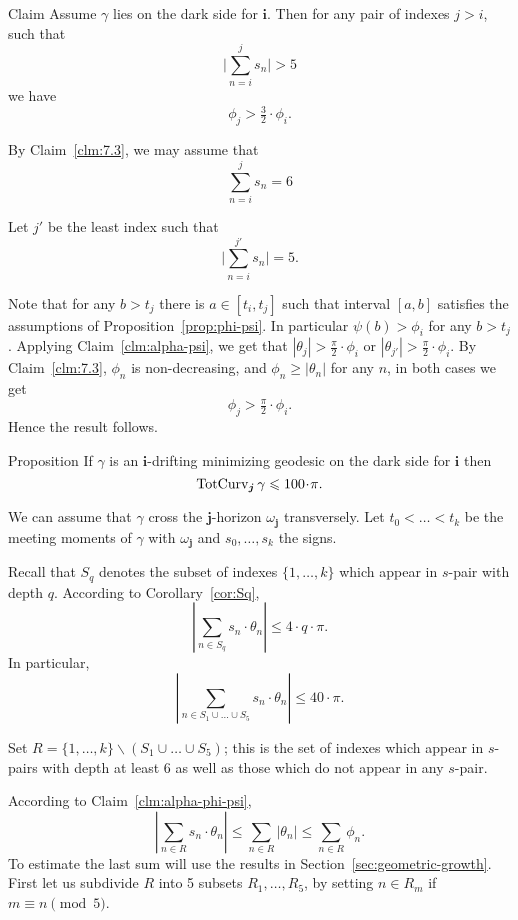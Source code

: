 \documentclass[a4paper,10pt]{article}
\begin{document}
\begin{thm}{Claim}\label{clm:geometric-grouth}
Assume $\gamma$ lies on the dark side for $\bm{i}$.
Then for any pair of indexes $j>i$,
such that 
\[\biggl|\sum_{n=i}^{j}s_n\biggr|> 5\]
we have
\[\phi_j>\tfrac32\cdot\phi_i.\]

\end{thm}


By Claim~\ref{clm:7.3}, we may assume that 
\[\sum_{n=i}^{j}s_n= 6\]

Let $j'$ be the least index 
such that
\[\biggl|\sum_{n=i}^{j'} s_n\biggr|=5.\]

Note that for any $b>t_j$ there is $a\in[t_i,t_j]$
such that interval $[a,b]$ satisfies the assumptions of Proposition~\ref{prop:phi-psi}.
In particular $\psi(b)>\phi_i$ for any $b>t_j$.
Applying Claim~\ref{clm:alpha-psi},
we get that $|\theta_j|>\tfrac\pi2\cdot \phi_i$ or 
$|\theta_{j'}|>\tfrac\pi2\cdot \phi_i$.
By Claim~\ref{clm:7.3}, $\phi_n$ is non-decreasing,
and $\phi_n\ge |\theta_n|$ for any $n$,
in both cases we get
\[\phi_j>\tfrac\pi2\cdot \phi_i.\]
Hence the result follows.
\qeds



\begin{thm}{Proposition}\label{prop:graph}
If $\gamma$ is an $\bm{i}$-drifting minimizing geodesic on the dark side for $\bm{i}$ then
\[\tc_{\bm{j}}\gamma\le 100\cdot\pi.\]

\end{thm}

We can assume that
$\gamma$ cross the $\bm{j}$-horizon $\omega_{\bm{j}}$ transversely.
Let $t_0<\dots<t_k$ be the meeting moments of $\gamma$ with $\omega_{\bm{j}}$ and
$s_0,\dots,s_k$ the signs.

Recall that $S_q$ denotes the subset of indexes $\{1,\dots,k\}$
which appear in $s$-pair with depth $q$.
According to Corollary~\ref{cor:Sq},
\[\left|\sum_{n\in S_q}s_n\cdot\theta_n\right|\le 4\cdot q\cdot \pi.\]
In particular,
\[\left|\sum_{n\in S_1\cup\dots\cup S_5}
s_n\cdot\theta_n\right|
\le 
40\cdot\pi.\]

Set $R=\{1,\dots,k\}\backslash (S_1\cup\dots\cup S_5)$;
this is the set of indexes which appear in $s$-pairs with depth at least $6$ 
as well as those which do not appear in any $s$-pair.

According to Claim~\ref{clm:alpha-phi-psi},
\[\left|\sum_{n\in R}
s_n\cdot\theta_n\right|
\le
\sum_{n\in R}
|\theta_n|\le \sum_{n\in R}\phi_n.\] 
To estimate the last sum will use the results in Section~\ref{sec:geometric-growth}.
First let us subdivide $R$ into 5 subsets $R_1,\dots,R_5$,
by setting 
$n\in R_m$ if $m\equiv n\pmod 5$.
\end{document}
